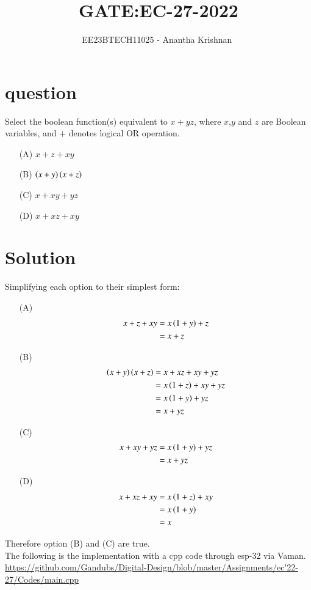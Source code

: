 \documentclass[journal,12pt,onecolumn]{IEEEtran}
\theoremstyle{remark}
\begin{document}

\vspace{3cm}

\title{GATE:EC-27-2022}
\author{EE23BTECH11025 - Anantha Krishnan $^{}$%
}
\maketitle
\bigskip



\section{question}
Select the boolean function(s) equivalent to $x+yz$, where $x$,$y$ and $z$ are Boolean variables, and $+$ denotes logical OR operation.
\begin{enumerate}
    \item [(A)] $x+z+xy$
    \item [(B)] $\left(x+y\right)\left(x+z\right)$
    \item [(C)] $x+xy+yz$
    \item [(D)] $x+xz+xy$
\end{enumerate}

\section{Solution}
Simplifying each option to their simplest form:
\begin{enumerate}
    \item [(A)]
    \begin{align}
        x+z+xy &= x\left(1+y\right) +z\\
        &=x+z
    \end{align}
    \item [(B)]
    \begin{align}
    \left(x+y\right)\left(x+z\right) &= x+xz+xy+yz\\
    &=x\left(1+z\right)+xy+yz\\
    &=x\left(1+y\right)+yz\\
    &=x+yz
        \end{align}
    \item [(C)]
    \begin{align}
        x+xy+yz &= x\left(1+y\right)+yz\\
        &=x+yz
    \end{align}
    \item [(D)]
    \begin{align}
        x+xz+xy &= x\left(1+z\right)+xy\\
        &=x\left(1+y\right)\\
        &=x
    \end{align}
\end{enumerate}
Therefore option (B) and (C) are true.\\
The following is the implementation with a cpp code through esp-32 via Vaman.\\
\url{https://github.com/Gandubs/Digital-Design/blob/master/Assignments/ec'22-27/Codes/main.cpp}
 
\end{document}

